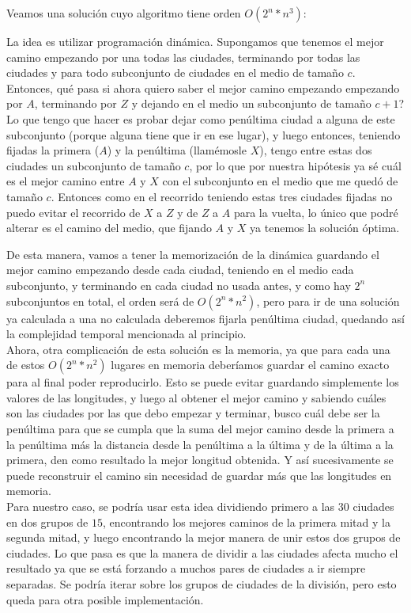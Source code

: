 \documentclass{article}
\begin{document}
Veamos una solución cuyo algoritmo tiene orden $ O(2^n * n^3) $:

La idea es utilizar programación dinámica. Supongamos que tenemos el mejor camino empezando por una todas las ciudades, terminando por todas las ciudades y para todo subconjunto de ciudades en el medio de tamaño $c$. Entonces, qué pasa si ahora quiero saber el mejor camino empezando empezando por $A$, terminando por $Z$ y dejando en el medio un subconjunto de tamaño $c+1$? Lo que tengo que hacer es probar dejar como penúltima ciudad a alguna de este subconjunto (porque alguna tiene que ir en ese lugar), y luego entonces, teniendo fijadas la primera ($A$) y la penúltima (llamémosle $X$), tengo entre estas dos ciudades un subconjunto de tamaño $c$, por lo que por nuestra hipótesis ya sé cuál es el mejor camino entre $A$ y $X$ con el subconjunto en el medio que me quedó de tamaño $c$. Entonces como en el recorrido teniendo estas tres ciudades fijadas no puedo evitar el recorrido de $X$ a $Z$ y de $Z$ a $A$ para la vuelta, lo único que podré alterar es el camino del medio, que fijando $A$ y $X$ ya tenemos la solución óptima.

De esta manera, vamos a tener la memorización de la dinámica guardando el mejor camino empezando desde cada ciudad, teniendo en el medio cada subconjunto, y terminando en cada ciudad no usada antes, y como hay $2^n$ subconjuntos en total, el orden será de $O(2^n  * n^2)$, pero para ir de una solución ya calculada a una no calculada deberemos fijarla penúltima ciudad, quedando así la complejidad temporal mencionada al principio.
\\

Ahora, otra complicación de esta solución es la memoria, ya que para cada una de estos $O(2^n * n^2)$ lugares en memoria deberíamos guardar el camino exacto para al final poder reproducirlo.
Esto se puede evitar guardando simplemente los valores de las longitudes, y luego al obtener el mejor camino y sabiendo cuáles son las ciudades por las que debo empezar y terminar, busco cuál debe ser la penúltima para que se cumpla que la suma del mejor camino desde la primera a la penúltima más la distancia desde la penúltima a la última y de la última a la primera, den como resultado la mejor longitud obtenida. Y así sucesivamente se puede reconstruir el camino sin necesidad de guardar más que las longitudes en memoria.
\\

Para nuestro caso, se podría usar esta idea dividiendo primero a las $30$ ciudades en dos grupos de $15$, encontrando los mejores caminos de la primera mitad y la segunda mitad, y luego encontrando la mejor manera de unir estos dos grupos de ciudades. Lo que pasa es que la manera de dividir a las ciudades afecta mucho el resultado ya que se está forzando a muchos pares de ciudades a ir siempre separadas.
Se podría iterar sobre los grupos de ciudades de la división, pero esto queda para otra posible implementación.
\end{document}
